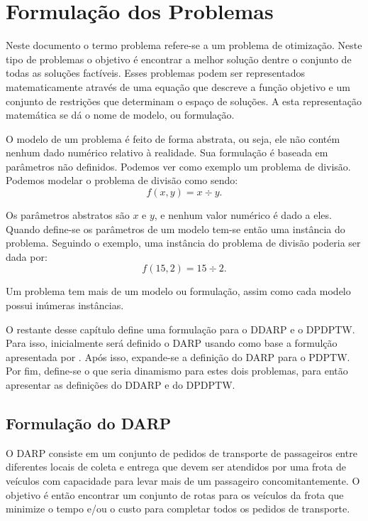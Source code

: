 \chapter{Formulação dos Problemas}\label{ch:formulacao_problemas}
Neste documento o termo problema refere-se a um problema de otimização.
Neste tipo de problemas o objetivo é encontrar a melhor solução dentre o
conjunto de todas as soluções factíveis.
Esses problemas podem ser representados matematicamente através de uma 
equação que descreve a função objetivo e um conjunto de restrições que
determinam o espaço de soluções.
A esta representação matemática se dá o nome de modelo, ou formulação.

O modelo de um problema é feito de forma abstrata, ou seja, ele não
contém nenhum dado numérico relativo à realidade. 
Sua formulação é baseada em parâmetros não definidos.
Podemos ver como exemplo um problema de divisão.
Podemos modelar o problema de divisão como sendo:
%
\begin{equation}
  f(x, y) = x \div y.
\end{equation}

\noindent Os parâmetros abstratos são $x$ e $y$, e nenhum valor 
numérico é dado a eles.
Quando define-se os parâmetros de um modelo tem-se então uma instância do
problema.
Seguindo o exemplo, uma instância do problema de divisão poderia ser dada por:
%
\begin{equation}
  f(15, 2) = 15 \div 2.
\end{equation}

\noindent Um problema tem mais de um modelo ou formulação, assim como cada
modelo possui inúmeras instâncias.

O restante desse capítulo define uma formulação para o DDARP e o DPDPTW. 
Para isso, inicialmente será definido o DARP usando como base a formulção 
apresentada por \textcite{cordeau_tabu_2003}. 
Após isso, expande-se a definição do DARP para o PDPTW. 
Por fim, define-se o que seria dinamismo para estes dois problemas, para então 
apresentar as definições do DDARP e do DPDPTW.

\section{Formulação do DARP}\label{sec:formulacao_DARP}
O DARP consiste em um conjunto de pedidos de transporte de passageiros entre 
diferentes locais de coleta e entrega que devem ser atendidos por uma frota
de veículos com capacidade para levar mais de um passageiro concomitantemente. 
O objetivo é então encontrar um conjunto de rotas para os veículos da frota
que minimize o tempo e/ou o custo para completar todos os pedidos de
transporte.

